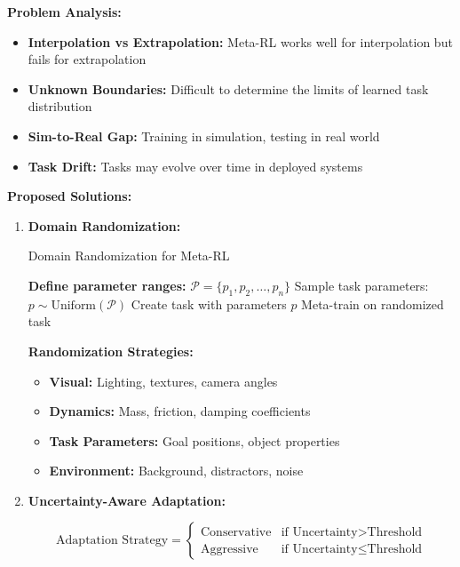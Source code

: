 \documentclass[12pt]{article}
\begin{document}
{{			\textbf{Problem Analysis:}
			
			\begin{itemize}
				\item \textbf{Interpolation vs Extrapolation:} Meta-RL works well for interpolation but fails for extrapolation
				\item \textbf{Unknown Boundaries:} Difficult to determine the limits of learned task distribution
				\item \textbf{Sim-to-Real Gap:} Training in simulation, testing in real world
				\item \textbf{Task Drift:} Tasks may evolve over time in deployed systems
			\end{itemize}
			
			\textbf{Proposed Solutions:}
			
			\begin{enumerate}
				\item \textbf{Domain Randomization:}
				
				\begin{algorithm}[H]
				\caption{Domain Randomization for Meta-RL}
				\begin{algorithmic}[1]
				\STATE \textbf{Define parameter ranges:} $\mathcal{P} = \{p_1, p_2, \ldots, p_n\}$
				\STATE Sample task parameters: $p \sim \text{Uniform}(\mathcal{P})$
				\STATE Create task with parameters $p$
				\STATE Meta-train on randomized task
				\ENDFOR
				\end{algorithmic}
				\end{algorithm}
				
				\textbf{Randomization Strategies:}
				\begin{itemize}
					\item \textbf{Visual:} Lighting, textures, camera angles
					\item \textbf{Dynamics:} Mass, friction, damping coefficients
					\item \textbf{Task Parameters:} Goal positions, object properties
					\item \textbf{Environment:} Background, distractors, noise
				\end{itemize}
				
				\item \textbf{Uncertainty-Aware Adaptation:}
				
				\begin{equation}
				\text{Adaptation Strategy} = \begin{cases}
				\text{Conservative} & \text{if } \text{Uncertainty} > \text{Threshold} \\
				\text{Aggressive} & \text{if } \text{Uncertainty} \leq \text{Threshold}
				\end{cases}
				\end{equation}
				

\end{enumerate}}}
\end{document}
